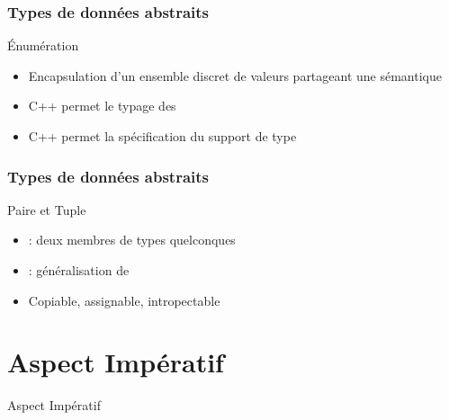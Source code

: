 \documentclass[svgnames]{beamer}
\begin{document}
\frame
{
  \frametitle{Types de données abstraits}
  \begin{block}{Énumération}
  \begin{itemize}
  \footnotesize
  \item Encapsulation d'un ensemble discret de valeurs partageant une sémantique
  \item C++ permet le typage des 
  \item C++ permet la spécification du support de type
  \end{itemize}
  
  \end{block}{}
}

\frame
{
  \frametitle{Types de données abstraits}
  \begin{block}{Paire et Tuple}
  \begin{itemize}
  \item {} : deux membres de types quelconques
  \item {} : généralisation de 
  \item Copiable, assignable, intropectable
  \end{itemize}
    

  \end{block}{}
}

\section{Aspect Imp\'eratif}
\begin{frame}[plain]
\begin{center}\Huge Aspect Imp\'eratif\end{center}
\end{frame}
\end{document}
